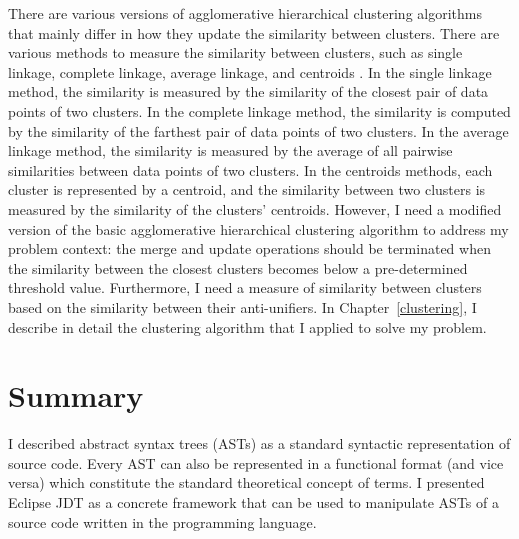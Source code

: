 

There are various versions of agglomerative hierarchical clustering algorithms that mainly differ in how they update the similarity between clusters. There are various methods to measure the similarity between clusters, such as single linkage, complete linkage, average linkage, and centroids \cite{Rasmussen:1992:CA:129687.129703}. In the single linkage method, the similarity is measured by the similarity of the closest pair of data points of two clusters. In the complete linkage method, the similarity is computed by the similarity of the farthest pair of data points of two clusters. In the average linkage method, the similarity is measured by the average of all pairwise similarities between data points of two clusters. In the centroids methods, each cluster is represented by a centroid, and the similarity between two clusters is measured by the similarity of the clusters' centroids. However, I need a modified version of the basic agglomerative hierarchical clustering algorithm to address my problem context: the merge and update operations should be terminated when the similarity between the closest clusters becomes below a pre-determined threshold value. Furthermore, I need a measure of similarity between clusters based on the similarity between their anti-unifiers. In Chapter~\ref{clustering}, I describe in detail the clustering algorithm that I applied to solve my problem.




\section{Summary}  \label{ch3:summary}
I described abstract syntax trees (ASTs) as a standard syntactic representation of source code. Every AST can also be represented in a functional format (and vice versa) which constitute the standard theoretical concept of terms. I presented Eclipse JDT as a concrete framework that can be used to manipulate ASTs of a source code written in the  programming language.

